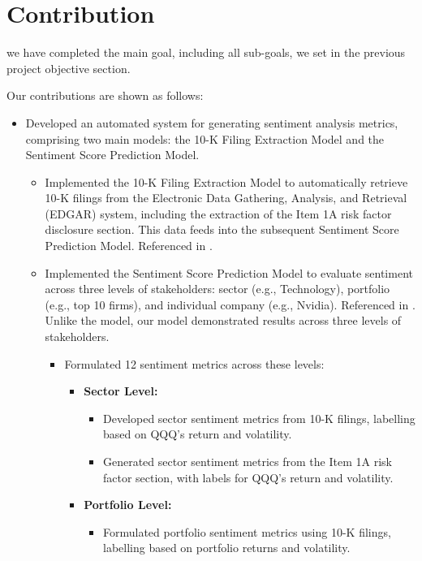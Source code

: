 \documentclass[logo,bsc,singlespacing,parskip]{infthesis}
\begin{document}
\section{Contribution}
\label{sec:contribution}
we have completed the main goal, including all sub-goals, we set in the previous project objective section. 

Our contributions are shown as follows:

\begin{itemize}
  \item Developed an automated system for generating sentiment analysis metrics, comprising two main models: the 10-K Filing Extraction Model and the Sentiment Score Prediction Model.
    \begin{itemize}
      \item Implemented the 10-K Filing Extraction Model to automatically retrieve 10-K filings from the Electronic Data Gathering, Analysis, and Retrieval (EDGAR) system, including the extraction of the Item 1A risk factor disclosure section. This data feeds into the subsequent Sentiment Score Prediction Model. Referenced in \cite{Sha2023}.
      \item Implemented the Sentiment Score Prediction Model to evaluate sentiment across three levels of stakeholders: sector (e.g., Technology), portfolio (e.g., top 10 firms), and individual company (e.g., Nvidia). Referenced in \cite{ke2020predicting}. Unlike the \cite{ke2020predicting} model, our model demonstrated results across three levels of stakeholders.
        \begin{itemize}
          \item Formulated 12 sentiment metrics across these levels:
            \begin{itemize}
              \item \textbf{Sector Level:}
                \begin{itemize}
                  \item Developed sector sentiment metrics from 10-K filings, labelling based on QQQ’s return and volatility.
                  \item Generated sector sentiment metrics from the Item 1A risk factor section, with labels for QQQ’s return and volatility.
                \end{itemize}
              \item \textbf{Portfolio Level:}
                \begin{itemize}
                  \item Formulated portfolio sentiment metrics using 10-K filings, labelling based on portfolio returns and volatility.

\end{itemize}
\end{itemize}
\end{itemize}
\end{itemize}
\end{itemize}
\end{document}
